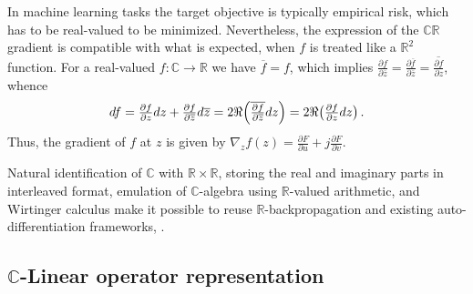 \documentclass[a4paper,10pt]{article}
\newcommand{\real}{\mathbb{R}}
\newcommand{\cplx}{\mathbb{C}}
\newcommand{\conj}[1]{\overline{#1}}
\begin{document}

In machine learning tasks the target objective is typically empirical risk, which has to
be real-valued to be minimized. Nevertheless, the expression of the $\cplx\real$ gradient
is compatible with what is expected, when $f$ is treated like a $\real^2$ function. For a
real-valued $f\colon \cplx \to \real$ we have $\conj{f} = f$, which implies $
  \tfrac{\partial f}{\partial \conj{z}}
    = \tfrac{\partial \conj{f}}{\partial \conj{z}}
    = \conj{\tfrac{\partial f}{\partial z}}
$, whence
$$
df
  = \tfrac{\partial f}{\partial z} dz
    + \tfrac{\partial f}{\partial \conj{z}} d\conj{z}
  = 2 \Re \Bigl(
    \conj{\tfrac{\partial f}{\partial \conj{z}}} dz
  \Bigr)
  = 2 \Re \bigl(
    \tfrac{\partial f}{\partial z} dz
  \bigr)
  \,. $$
Thus, the gradient of $f$ at $z$ is given by $
  \nabla_z f(z)
    = \tfrac{\partial F}{\partial u}
      + j \tfrac{\partial F}{\partial v}
$.

Natural identification of $\cplx$ with $\real\times \real$, storing the real and imaginary
parts in interleaved format, emulation of $\cplx$-algebra using $\real$-valued arithmetic,
and Wirtinger calculus make it possible to reuse $\real$-backpropagation and existing
auto-differentiation frameworks, \citep{trabelsi_deep_2017}.


\subsection{$\cplx$-Linear operator representation} %
\label{sub:c-linear_operator_representation}
\end{document}
